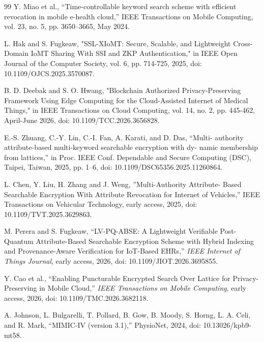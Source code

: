 \documentclass{ieeetj}
\theoremstyle{ieee-style}
\begin{document}
\begin{thebibliography}{99}
Y. Miao et al., “Time-controllable keyword search scheme with
efficient revocation in mobile e-health cloud,” IEEE Transactions on
Mobile Computing, vol. 23, no. 5, pp. 3650–3665, May 2024.

L. Hak and S. Fugkeaw, "SSL-XIoMT: Secure, Scalable, and Lightweight Cross-Domain IoMT Sharing With SSI and ZKP Authentication," in IEEE Open Journal of the Computer Society, vol. 6, pp. 714-725, 2025, doi: 10.1109/OJCS.2025.3570087.

B. D. Deebak and S. O. Hwang, "Blockchain Authorized Privacy-Preserving Framework Using Edge Computing for the Cloud-Assisted Internet of Medical Things," in IEEE Transactions on Cloud Computing, vol. 14, no. 2, pp. 445-462, April-June 2026, doi: 10.1109/TCC.2026.3656828. 

E.-S. Zhuang, C.-Y. Lin, C.-I. Fan, A. Karati, and D. Das, “Multi-
authority attribute-based multi-keyword searchable encryption with dy-
namic membership from lattices,” in Proc. IEEE Conf. Dependable
and Secure Computing (DSC), Taipei, Taiwan, 2025, pp. 1–6, doi:
10.1109/DSC65356.2025.11260864.

L. Chen, Y. Liu, H. Zhang and J. Weng, ”Multi-Authority Attribute-
Based Searchable Encryption With Attribute Revocation for Internet of
Vehicles,” IEEE Transactions on Vehicular Technology, early access,
2025, doi: 10.1109/TVT.2025.3629863.

M. Perera and S. Fugkeaw,
``LV-PQ-ABSE: A Lightweight Verifiable Post-Quantum Attribute-Based
Searchable Encryption Scheme with Hybrid Indexing and
Provenance-Aware Verification for IoT-Based EHRs,''
\textit{IEEE Internet of Things Journal}, early access, 2026,
doi: 10.1109/JIOT.2026.3695855.

Y. Cao et al.,
``Enabling Puncturable Encrypted Search Over Lattice for
Privacy-Preserving in Mobile Cloud,''
\textit{IEEE Transactions on Mobile Computing}, early access, 2026,
doi: 10.1109/TMC.2026.3682118.

A. Johnson, L. Bulgarelli, T. Pollard, B. Gow, B. Moody,
S. Horng, L. A. Celi, and R. Mark,
``MIMIC-IV (version 3.1),''
PhysioNet, 2024, doi: 10.13026/kpb9-mt58.

\end{thebibliography}
\end{document}
